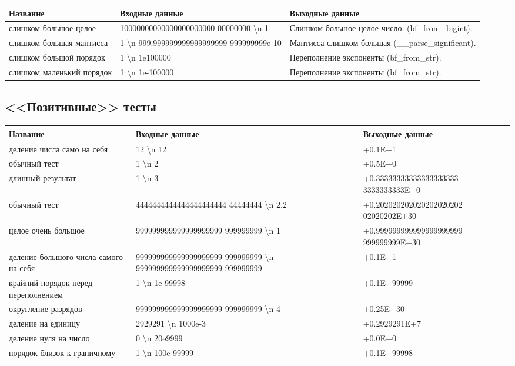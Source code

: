 \documentclass[a4paper,12pt]{extarticle}
\begin{document}
\begin{tabular}{ |p{4cm}|p{5cm}|p{5cm}| }
\hline
\textbf{Название} & \textbf{Входные данные} & \textbf{Выходные данные} \\ \hline
слишком большое целое & 10000000000000000000000 00000000 \textbackslash n 1 & Слишком большое целое число. (bf\_from\_bigint). \\ \hline
слишком большая мантисса & 1 \textbackslash n 999.999999999999999999 999999999e-10 & Мантисса слишком большая (\_\_parse\_significant). \\ \hline
слишком большой порядок & 1 \textbackslash n 1e100000 & Переполнение экспоненты (bf\_from\_str). \\ \hline
слишком маленький порядок & 1 \textbackslash n 1e-100000 & Переполнение экспоненты (bf\_from\_str). \\ \hline
\end{tabular}

\subsection{<<Позитивные>> тесты}
\begin{tabular}{ |p{4cm}|p{5cm}|p{5cm}| }
\hline
\textbf{Название} & \textbf{Входные данные} & \textbf{Выходные данные} \\ \hline
деление числа само на себя & 12 \textbackslash n 12 & +0.1E+1 \\ \hline
обычный тест & 1 \textbackslash n 2 & +0.5E+0 \\ \hline
длинный результат & 1 \textbackslash n 3 & +0.33333333333333333333 3333333333E+0 \\ \hline
обычный тест & 4444444444444444444444 44444444 \textbackslash n 2.2 & +0.202020202020202020202 02020202E+30 \\ \hline

целое очень большое & 999999999999999999999 999999999 \textbackslash n 1 & +0.999999999999999999999 999999999E+30 \\ \hline

деление большого числа самого на себя & 999999999999999999999 999999999 \textbackslash n 999999999999999999999 999999999 & +0.1E+1 \\ \hline

крайний порядок перед переполнением & 1 \textbackslash n 1e-99998 & +0.1E+99999 \\ \hline

округление разрядов & 999999999999999999999 999999999 \textbackslash n 4 & +0.25E+30 \\ \hline
деление на единицу & 2929291 \textbackslash n 1000e-3 & +0.2929291E+7 \\ \hline
деление нуля на число & 0 \textbackslash n 20e9999 & +0.0E+0 \\ \hline
порядок близок к граничному & 1 \textbackslash n 100e-99999 & +0.1E+99998 \\ \hline
\end{tabular}
\newpage
\end{document}
